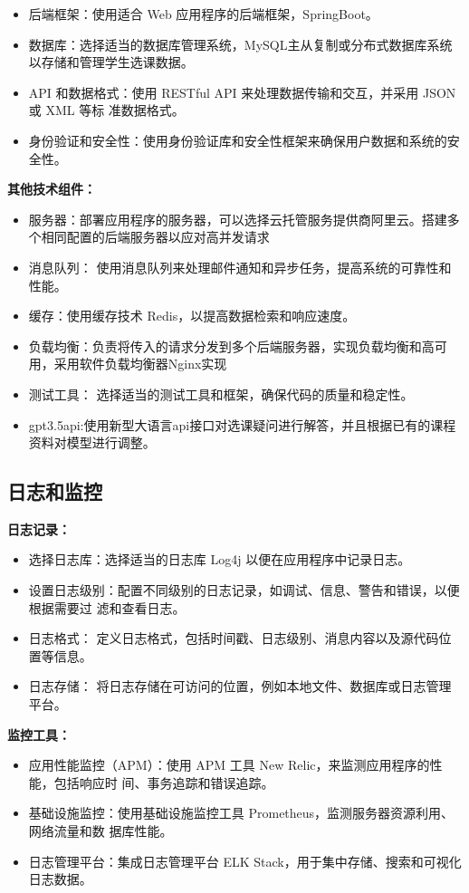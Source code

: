 \documentclass{article}
\begin{document}
\begin{itemize}
	\item 后端框架：使用适合 Web 应用程序的后端框架，SpringBoot。
	\item 数据库：选择适当的数据库管理系统，MySQL主从复制或分布式数据库系统 以存储和管理学生选课数据。
	\item API 和数据格式：使用 RESTful API 来处理数据传输和交互，并采用 JSON 或 XML 等标
	准数据格式。
	\item 身份验证和安全性：使用身份验证库和安全性框架来确保用户数据和系统的安全性。
\end{itemize}

\textbf{其他技术组件：}

\begin{itemize}

  \item 服务器：部署应用程序的服务器，可以选择云托管服务提供商阿里云。搭建多个相同配置的后端服务器以应对高并发请求
  \item 消息队列： 使用消息队列来处理邮件通知和异步任务，提高系统的可靠性和性能。
  \item 缓存：使用缓存技术 Redis，以提高数据检索和响应速度。
  \item 负载均衡：负责将传入的请求分发到多个后端服务器，实现负载均衡和高可用，采用软件负载均衡器Nginx实现
  \item 测试工具： 选择适当的测试工具和框架，确保代码的质量和稳定性。
  \item gpt3.5api:使用新型大语言api接口对选课疑问进行解答，并且根据已有的课程资料对模型进行调整。
\end{itemize}

\subsection{日志和监控}

\textbf{日志记录：}
\begin{itemize}
	\item 选择日志库：选择适当的日志库 Log4j 以便在应用程序中记录日志。
	\item 设置日志级别：配置不同级别的日志记录，如调试、信息、警告和错误，以便根据需要过
	滤和查看日志。
	\item 日志格式： 定义日志格式，包括时间戳、日志级别、消息内容以及源代码位置等信息。
	\item 日志存储： 将日志存储在可访问的位置，例如本地文件、数据库或日志管理平台。
\end{itemize}

\textbf{监控工具：}
\begin{itemize}
	\item 应用性能监控（APM）：使用 APM 工具 New Relic，来监测应用程序的性能，包括响应时
	间、事务追踪和错误追踪。
	\item 基础设施监控：使用基础设施监控工具 Prometheus，监测服务器资源利用、网络流量和数
	据库性能。
	\item 日志管理平台：集成日志管理平台 ELK Stack，用于集中存储、搜索和可视化日志数据。
\end{itemize}
\end{document}
